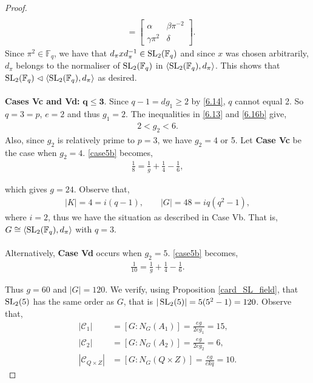 \begin{proof}
\begin{align*}
\\[1.5ex] &= \begin{bmatrix} \alpha & \beta \pi^{-2} \\ \gamma \pi^{2} & \delta \end{bmatrix}. 
\end{align*}
Since $\pi^2 \in \mathbb{F}_q$, we have that $d_\pi x d_\pi^{-1} \in \operatorname{SL}_2(\mathbb{F}_q)$ and since $x$ was chosen arbitrarily, $d_\pi$ belongs to the normaliser of $\operatorname{SL}_2(\mathbb{F}_q)$ in $\langle \operatorname{SL}_2(\mathbb{F}_q), d_\pi \rangle$. This shows that $\operatorname{SL}_2(\mathbb{F}_q) \vartriangleleft \langle \operatorname{SL}_2(\mathbb{F}_q), d_\pi \rangle$ as desired. \\
\\
 \space \textbf{Cases Vc and Vd:} $\pmb{q \leq 3}$. Since $q - 1 = d g_1 \geq 2$ by \eqref{6.14}, $q$ cannot equal 2. So $q = 3 = p$, $e = 2$ and thus $g_1 = 2$. The inequalities in \eqref{6.13} and \eqref{6.16b} give,
\begin{align*} 2 < g_2 < 6.
\end{align*}
Also, since $g_2$ is relatively prime to $p=3$, we have $g_2 = 4$ or 5. Let \textbf{Case Vc} be the case when $g_2 = 4$. \eqref{case5b} becomes,
\begin{align*} \frac{1}{8} = \frac{1}{g} + \frac{1}{4} - \frac{1}{6},
\end{align*}

which gives $g = 24$. Observe that,
\begin{align*} |K| = 4 = i(q-1), \qquad |G| = 48 = iq(q^2-1),
\end{align*}
where $i=2$, thus we have the situation as described in Case Vb. That is, $G \cong \langle \operatorname{SL}_2(\mathbb{F}_q), d_\pi \rangle$ with $q=3$.\\
\\
Alternatively, \textbf{Case Vd} occurs when $g_2 = 5$. \eqref{case5b} becomes,
\begin{align*} \frac{1}{10} = \frac{1}{g} + \frac{1}{4} - \frac{1}{6}.
\end{align*}

Thus $g = 60 $ and $|G| = 120$. We verify, using Proposition \ref{card_SL_field}, that $\operatorname{SL}_2(5)$ has the same order as $G$, that is $|\operatorname{SL}_2(5)| = 5(5^2-1) =120$. Observe that,
\begin{align*} |\mathcal{C}_1| &= [G : N_G(A_1)] = \frac{eg}{2eg_1} = 15,
\\[1ex] |\mathcal{C}_2| &= [G : N_G(A_2)] = \frac{eg}{2eg_2} = 6,
\\[1ex] |\mathcal{C}_{Q \times Z}| &= [G : N_G(Q \times Z)] = \frac{eg}{ekq} = 10.
\end{align*}


\end{proof}
